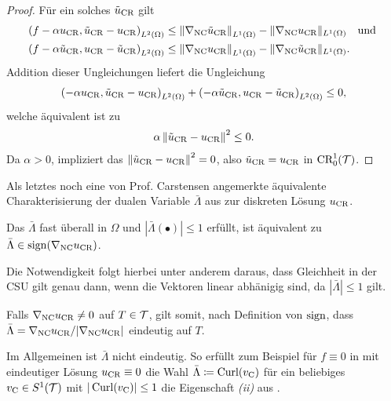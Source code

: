 \begin{proof}
  Für ein solches $\tilde{u}_{\textup{CR}}$ gilt
  \begin{align*}
    \left(f-\alpha u_\textup{CR},\tilde{u}_{\textup{CR}}-u_\textup{CR}\right)_{L^2(\Omega)} 
    &\leq
    \left\Vert\nabla_\textup{NC}\tilde{u}_{\textup{CR}}\right\Vert_{L^1(\Omega)}
    -\Vert\nabla_\textup{NC}u_\textup{CR}\Vert_{L^1(\Omega)}\quad\text{und }\\
    \left(f-\alpha\tilde{u}_{\textup{CR}},u_\textup{CR}-\tilde{u}_{\textup{CR}}\right)_{L^2(\Omega)} 
    &\leq
    \left\Vert\nabla_\textup{NC}u_\textup{CR}\right\Vert_{L^1(\Omega)}
    -\Vert\nabla_\textup{NC}\tilde{u}_{\textup{CR}}\Vert_{L^1(\Omega)}. 
  \end{align*}
  Addition dieser Ungleichungen
  liefert die Ungleichung
  \begin{align*}
    \left(-\alpha u_\textup{CR},\tilde{u}_{\textup{CR}}-u_\textup{CR}\right)_{L^2(\Omega)} 
    + \left(-\alpha\tilde{u}_{\textup{CR}},u_\textup{CR}-\tilde{u}_{\textup{CR}}\right)_{L^2(\Omega)} 
    \leq
    0,
  \end{align*}
  welche äquivalent ist zu
  \begin{align*}
    \alpha\left\Vert\tilde{u}_{\textup{CR}}-u_\textup{CR}\right\Vert^2
    \leq
    0.
  \end{align*}
  Da $\alpha>0$, impliziert das
  $\left\Vert\tilde{u}_{\textup{CR}}-u_\textup{CR}\right\Vert^2=0$, also
  $\tilde{u}_{\textup{CR}}=u_\textup{CR}$ in $\textup{CR}^1_0(\mathcal{T})$.
\end{proof}

Als letztes noch eine von Prof. Carstensen angemerkte äquivalente 
Charakterisierung der dualen Variable $\bar\Lambda$ aus
   zur diskreten Lösung
  $u_\textup{CR}$.
\begin{remark}
  Das $\bar\Lambda$ fast überall in $\Omega$
   und
  $|\bar\Lambda(\bullet)|\leq 1$ erfüllt, ist äquivalent zu 
  $\bar\Lambda\in\operatorname{sign}(\nabla_\textup{NC} u_\textup{CR})$.   

  Die Notwendigkeit folgt hierbei unter anderem daraus, dass Gleichheit in der
  CSU gilt genau dann, wenn die Vektoren linear abhänigig sind, da
  $|\bar\Lambda|\leq 1$ gilt.

  Falls $\nabla_\textup{NC}u_\textup{CR}\neq 0$ auf $T\in\mathcal{T}$, gilt somit, nach Definition von
  $\operatorname{sign}$, dass $\bar\Lambda=\nabla_\textup{NC}u_\textup{CR}/|\nabla_\textup{NC}u_\textup{CR}|$ eindeutig auf
  $T$.

  Im Allgemeinen ist $\bar\Lambda$ nicht eindeutig. So erfüllt zum Beispiel
  für $f\equiv 0$ in  mit eindeutiger Lösung
  $u_\textup{CR}\equiv 0$ die Wahl $\bar\Lambda\coloneqq \operatorname{Curl}(v_{\textup{C}})$ für ein beliebiges
  $v_{\textup{C}}\in S^1(\mathcal{T})$ mit $|\operatorname{Curl}(v_{\textup{C}})|\leq 1$ die Eigenschaft \textit{(ii)}
  aus .
\end{remark}


